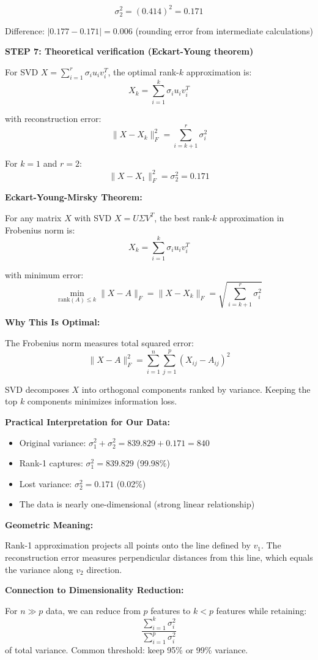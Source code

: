 \documentclass[12pt]{article}
\begin{document}
\begin{solution}
\[
\sigma_2^2 = (0.414)^2 = 0.171
\]

Difference: $|0.177 - 0.171| = 0.006$ (rounding error from intermediate calculations)

\textbf{STEP 7: Theoretical verification (Eckart-Young theorem)}

For SVD $X = \sum_{i=1}^r \sigma_i u_i v_i^T$, the optimal rank-$k$ approximation is:
\[
X_k = \sum_{i=1}^k \sigma_i u_i v_i^T
\]

with reconstruction error:
\[
\|X - X_k\|_F^2 = \sum_{i=k+1}^r \sigma_i^2
\]

For $k=1$ and $r=2$:
\[
\|X - X_1\|_F^2 = \sigma_2^2 = 0.171
\]


\end{solution}

\begin{explanation}

\textbf{Eckart-Young-Mirsky Theorem:}

For any matrix $X$ with SVD $X = U\Sigma V^T$, the best rank-$k$ approximation in Frobenius norm is:
\[
X_k = \sum_{i=1}^k \sigma_i u_i v_i^T
\]

with minimum error:
\[
\min_{\text{rank}(A) \leq k} \|X - A\|_F = \|X - X_k\|_F = \sqrt{\sum_{i=k+1}^r \sigma_i^2}
\]

\textbf{Why This Is Optimal:}

The Frobenius norm measures total squared error:
\[
\|X - A\|_F^2 = \sum_{i=1}^n \sum_{j=1}^p (X_{ij} - A_{ij})^2
\]

SVD decomposes $X$ into orthogonal components ranked by variance. Keeping the top $k$ components minimizes information loss.

\textbf{Practical Interpretation for Our Data:}

\begin{itemize}
    \item Original variance: $\sigma_1^2 + \sigma_2^2 = 839.829 + 0.171 = 840$
    \item Rank-1 captures: $\sigma_1^2 = 839.829$ (99.98\%)
    \item Lost variance: $\sigma_2^2 = 0.171$ (0.02\%)
    \item The data is nearly one-dimensional (strong linear relationship)
\end{itemize}

\textbf{Geometric Meaning:}

Rank-1 approximation projects all points onto the line defined by $v_1$. The reconstruction error measures perpendicular distances from this line, which equals the variance along $v_2$ direction.

\textbf{Connection to Dimensionality Reduction:}

For $n \gg p$ data, we can reduce from $p$ features to $k < p$ features while retaining:
\[
\frac{\sum_{i=1}^k \sigma_i^2}{\sum_{i=1}^p \sigma_i^2}
\]
of total variance. Common threshold: keep 95\% or 99\% variance.

\end{explanation}
\end{document}
